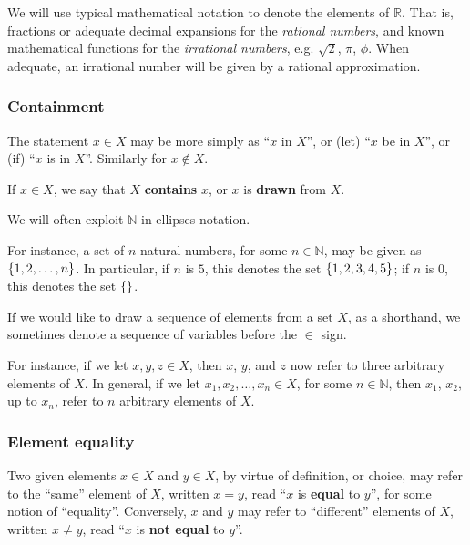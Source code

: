We will use typical mathematical notation to denote the elements of
$\mathbb{R}$. That is, fractions or adequate decimal expansions for the
\emph{rational numbers}, and known mathematical functions for the
\emph{irrational numbers}, e.g. $\sqrt{2}$, $\pi$, $\phi$. When adequate,
an irrational number will be given by a rational approximation.

\subsubsection{Containment}

The statement $x\in X$ may be more simply as ``$x$ in $X$'', or (let) ``$x$ be
in $X$'', or (if) ``$x$ is in $X$''. Similarly for $x\notin X$.

\begin{definition} If $x\in X$, we say that $X$ \textbf{contains} $x$, or $x$
is \textbf{drawn} from $X$.\end{definition}

\begin{remark} We will often exploit $\mathbb{N}$ in ellipses
notation.\end{remark}

For instance, a set of $n$ natural numbers, for some $n\in\mathbb{N}$, may be
given as $\mathopen{}\left\{{1,2,\ldots,n}\right\}\mathclose{}$. In particular, if $n$ is $5$, this denotes the
set $\mathopen{}\left\{{1,2,3,4,5}\right\}\mathclose{}$; if $n$ is $0$, this denotes the set $\mathopen{}\left\{{}\right\}\mathclose{}$.

\begin{notation} If we would like to draw a sequence of elements from a set
$X$, as a shorthand, we sometimes denote a sequence of variables before the
$\in$ sign. \end{notation}

For instance, if we let $x,y,z\in X$, then $x$, $y$, and $z$ now refer to three
arbitrary elements of $X$. In general, if we let $x_1,x_2,\ldots,x_n\in X$, for
some $n\in\mathbb{N}$, then $x_1$, $x_2$, up to $x_n$, refer to $n$ arbitrary
elements of $X$.

\subsubsection{Element equality}

\begin{notation} Two given elements $x\in X$ and $y\in X$, by virtue of
definition, or choice, may refer to the ``same'' element of $X$, written $x=y$,
read ``$x$ is \textbf{equal} to $y$'', for some notion of ``equality''.
Conversely, $x$ and $y$ may refer to ``different'' elements of $X$, written
$x\neq y$, read ``$x$ is \textbf{not equal} to $y$''.\end{notation}

